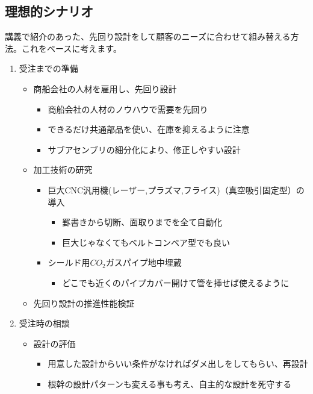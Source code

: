 \documentclass[dvipdfmx,a4paper]{jsarticle}
\begin{document}
\subsection{理想的シナリオ}
講義で紹介のあった、先回り設計をして顧客のニーズに合わせて組み替える方法。これをベースに考えます。
\begin{enumerate}
    \item 受注までの準備
    \begin{itemize}
        \item 商船会社の人材を雇用し、先回り設計
        \begin{itemize}
            \item 商船会社の人材のノウハウで需要を先回り
            \item できるだけ共通部品を使い、在庫を抑えるように注意
            \item サブアセンブリの細分化により、修正しやすい設計
        \end{itemize}
        \item 加工技術の研究
        \begin{itemize}
            \item 巨大CNC汎用機(レーザー,プラズマ,フライス)（真空吸引固定型）の導入
            \begin{itemize}
                \item 罫書きから切断、面取りまでを全て自動化
                \item 巨大じゃなくてもベルトコンベア型でも良い
            \end{itemize}
            \item シールド用$CO_2$ガスパイプ地中埋蔵
            \begin{itemize}
                \item どこでも近くのパイプカバー開けて管を挿せば使えるように
            \end{itemize}
        \end{itemize}
        \item 先回り設計の推進性能検証
    \end{itemize}
    \item 受注時の相談
    \begin{itemize}
        \item 設計の評価
        \begin{itemize}
            \item 用意した設計からいい条件がなければダメ出しをしてもらい、再設計
            \item 根幹の設計パターンも変える事も考え、自主的な設計を死守する

\end{itemize}
\end{itemize}
\end{enumerate}
\end{document}
